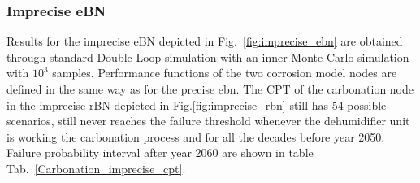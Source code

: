 \subsubsection{Imprecise eBN}
Results for the imprecise eBN depicted in Fig.~\ref{fig:imprecise_ebn} are obtained through standard Double Loop simulation with an inner Monte Carlo simulation with $10^3$ samples. Performance functions of the two corrosion model nodes are defined in the same way as for the precise ebn.
The CPT of the carbonation node in the imprecise rBN depicted in Fig.\ref{fig:imprecise_rbn} still has 54 possible scenarios, still never reaches the failure threshold whenever the dehumidifier unit is working the carbonation process and for all the decades before year 2050. Failure probability interval  after year 2060 are shown in table Tab.~\ref{Carbonation_imprecise_cpt}.

